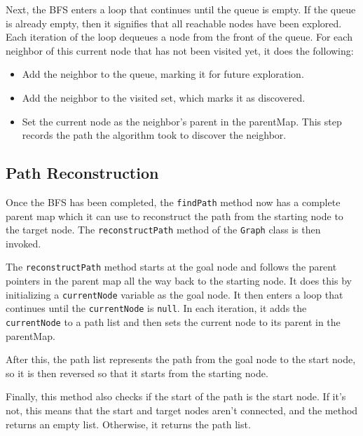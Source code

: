 Next, the BFS enters a loop that continues until the queue is empty. If the queue is already empty, then it signifies that all reachable nodes have been explored. Each iteration of the loop dequeues a node from the front of the queue. For each neighbor of this current node that has not been visited yet, it does the following:
\begin{itemize}
	\item Add the neighbor to the queue, marking it for future exploration.
	\item Add the neighbor to the visited set, which marks it as discovered.
	\item Set the current node as the neighbor's parent in the parentMap. This step records the path the algorithm took to discover the neighbor.
\end{itemize}

\subsection*{\textbf{Path Reconstruction}}

Once the BFS has been completed, the \texttt{findPath} method now has a complete parent map which it can use to reconstruct the path from the starting node to the target node. The \texttt{reconstructPath} method of the \texttt{Graph} class is then invoked.

The \texttt{reconstructPath} method starts at the goal node and follows the parent pointers in the parent map all the way back to the starting node. It does this by initializing a \texttt{currentNode} variable as the goal node. It then enters a loop that continues until the \texttt{currentNode} is \texttt{null}. In each iteration, it adds the \texttt{currentNode} to a path list and then sets the current node to its parent in the parentMap.

After this, the path list represents the path from the goal node to the start node, so it is then reversed so that it starts from the starting node.

Finally, this method also checks if the start of the path is the start node. If it's not, this means that the start and target nodes aren't connected, and the method returns an empty list. Otherwise, it returns the path list.